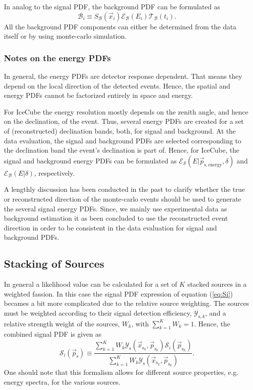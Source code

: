 \documentclass{article}
\newcommand{\ps}{\vec{p}_{\mathrm{s}}}
\newcommand{\psk}{\vec{p}_{\mathrm{s}_k}}
\newcommand{\xsk}{\vec{x}_{\mathrm{s}_k}}
\begin{document}
In analog to the signal PDF, the background PDF can be formulated as
\begin{equation}
 \mathcal{B}_i \equiv S_{\mathcal{B}}(\vec{x}_i) \mathcal{E}_{\mathcal{B}}(E_i) \mathcal{T}_{\mathcal{B}}(t_i).
 \label{eq:Bi}
\end{equation}
All the background PDF components can either be determined from the data itself
or by using monte-carlo simulation.

\subsubsection{Notes on the energy PDFs}

In general, the energy PDFs are detector response dependent. That means they
depend on the local direction of the detected events. Hence, the spatial and
energy PDFs cannot be factorized entirely in space and energy.

For IceCube the energy resolution mostly depends on the zenith angle, and hence
on the declination, of the event. Thus, several energy PDFs are created for a
set of (reconstructed) declination bands, both, for signal and background. At
the data evaluation, the signal and background PDFs are selected corresponding
to the declination band the event's declination is part of. Hence, for IceCube,
the signal and background energy PDFs can be formulated as
$\mathcal{E}_{\mathcal{S}}(E|\vec{p}_{\mathrm{s,energy}},\delta)$ and
$\mathcal{E}_{\mathcal{B}}(E|\delta)$, respectively.

A lengthly discussion has been conducted in the past to clarify whether the true or
reconstructed direction of the monte-carlo events should be used to generate
the several signal energy PDFs. Since, we mainly use experimental data as
background estimation it as been concluded to use the reconstructed event
direction in order to be consistent in the data evaluation for signal and
background PDFs.

\subsection{Stacking of Sources}

In general a likelihood value can be calculated for a set of $K$ stacked
sources in a weighted fassion. In this case the signal PDF expression of
equation (\ref{eq:Si}) becames a bit more complicated due to the relative
source weighting. The sources must be weighted according to their signal detection
efficiency, $\mathcal{Y}_{\mathrm{s},k}$, and a relative strength weight of the
sources, $W_k$, with $\sum_{k=1}^{K} W_k = 1$. Hence, the combined signal PDF is
given as
\begin{equation}
 \mathcal{S}_i(\ps) \equiv \frac{\sum_{k=1}^{K} W_k \mathcal{Y}_{\mathrm{s}}(\xsk,\psk) \mathcal{S}_{i}(\psk)}{\sum_{k=1}^{K}W_k\mathcal{Y}_{\mathrm{s}}(\xsk,\psk)}.
 \label{eq:SiStacking}
\end{equation}
One should note that this formalism allows for different source properties, e.g.
energy spectra, for the various sources.
\end{document}
